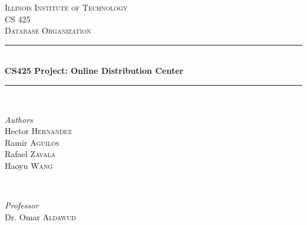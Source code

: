 \documentclass[12pt]{article}
\begin{document}
\newenvironment{myspace}[1]
	{\begin{spacing}{#1}}
	{\end{spacing}}


\begin{titlepage} %
	\newcommand{\HRule}{\rule{\linewidth}{0.5mm}} %
	
	\center %
	
	
	\textsc{\LARGE Illinois Institute of Technology}\\[1.5cm] %
	
	\textsc{\Large CS 425}\\[0.5cm] %
	
	\textsc{\large Database Organization}\\[0.5cm] %
	
	
	\HRule\\[0.4cm]
	
	{\huge\bfseries CS425 Project: Online Distribution Center}\\[0.4cm] %
	
	\HRule\\[1.5cm]
	
	
	\begin{minipage}{0.4\textwidth}
		\begin{flushleft}
			\large
			\textit{Authors}\\
			Hector \textsc{Hernandez}\\
			Ramir \textsc{Aguilos}\\
			Rafael \textsc{Zavala}\\
			Haoyu \textsc{Wang}
		\end{flushleft}
	\end{minipage}
	~
	\begin{minipage}{0.4\textwidth}
		\begin{flushright}
			\large
			\textit{Professor}\\
			Dr. Omar \textsc{Aldawud} %
		\end{flushright}
	\end{minipage}
	

\end{titlepage}
\end{document}
